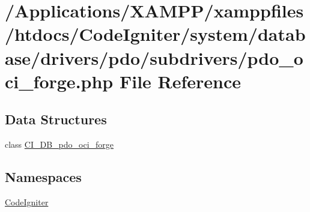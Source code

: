 \hypertarget{pdo__oci__forge_8php}{}\section{/\+Applications/\+X\+A\+M\+P\+P/xamppfiles/htdocs/\+Code\+Igniter/system/database/drivers/pdo/subdrivers/pdo\+\_\+oci\+\_\+forge.php File Reference}
\label{pdo__oci__forge_8php}
\subsection*{Data Structures}
\begin{DoxyCompactItemize}
\item 
class \mbox{\hyperlink{class_c_i___d_b__pdo__oci__forge}{C\+I\+\_\+\+D\+B\+\_\+pdo\+\_\+oci\+\_\+forge}}
\end{DoxyCompactItemize}
\subsection*{Namespaces}
\begin{DoxyCompactItemize}
\item 
 \mbox{\hyperlink{namespace_code_igniter}{Code\+Igniter}}
\end{DoxyCompactItemize}
